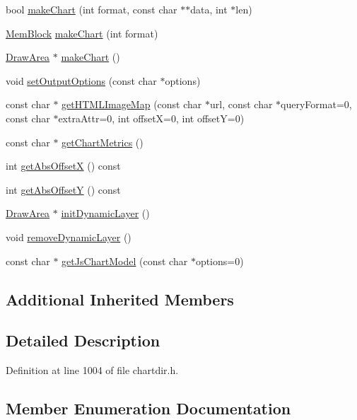 \begin{DoxyCompactItemize}
\item 
bool \hyperlink{class_base_chart_a7b18e9ce35315e1cdbe3f829896b2ba7}{make\+Chart} (int format, const char $\ast$$\ast$data, int $\ast$len)
\item 
\hyperlink{class_mem_block}{Mem\+Block} \hyperlink{class_base_chart_a97cefd6a0a1a6a9cd496396624de75e1}{make\+Chart} (int format)
\item 
\hyperlink{class_draw_area}{Draw\+Area} $\ast$ \hyperlink{class_base_chart_a72d9fdf1ba817ccc84e874c36317f5e7}{make\+Chart} ()
\item 
void \hyperlink{class_base_chart_a486db479183dceab6fe3ff27570fc249}{set\+Output\+Options} (const char $\ast$options)
\item 
const char $\ast$ \hyperlink{class_base_chart_af56d91a779cc7d6fd5c51c85dc58253c}{get\+H\+T\+M\+L\+Image\+Map} (const char $\ast$url, const char $\ast$query\+Format=0, const char $\ast$extra\+Attr=0, int offsetX=0, int offsetY=0)
\item 
const char $\ast$ \hyperlink{class_base_chart_a3dd3942f4e9685be181a34309a7f5b7d}{get\+Chart\+Metrics} ()
\item 
int \hyperlink{class_base_chart_a57090d85dc5afd9ecc627e8727c00d19}{get\+Abs\+OffsetX} () const
\item 
int \hyperlink{class_base_chart_a46db46e9ba9ac9bc9ef111a6e82221c0}{get\+Abs\+OffsetY} () const
\item 
\hyperlink{class_draw_area}{Draw\+Area} $\ast$ \hyperlink{class_base_chart_acef63841f659fbacdad0b1a63997a89c}{init\+Dynamic\+Layer} ()
\item 
void \hyperlink{class_base_chart_a89dc9e3a549543beff75c430c42887ca}{remove\+Dynamic\+Layer} ()
\item 
const char $\ast$ \hyperlink{class_base_chart_ab6a378f12f18f5e95084b0e49cc4873f}{get\+Js\+Chart\+Model} (const char $\ast$options=0)
\end{DoxyCompactItemize}
\subsection*{Additional Inherited Members}


\subsection{Detailed Description}


Definition at line 1004 of file chartdir.\+h.



\subsection{Member Enumeration Documentation}
\mbox{\label{class_base_chart_a04799cfecc3507923999fba7f4b50361}} 

